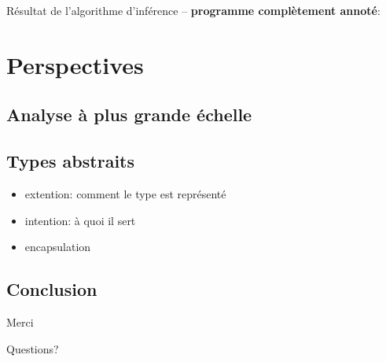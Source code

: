 \documentclass{beamer}
\def\codeout#1{
    \begin{center}
    \fboxsep=2mm
    \colorbox{codeoutcol}{\BUseVerbatim{#1}}
    \end{center}
}
\begin{document}
\begin{frame}[fragile]


Résultat de l'algorithme d'inférence -- \textbf{programme complètement annoté}:

\codeout{drmok}
\end{frame}

\section{Perspectives}

\subsection{Analyse à plus grande échelle}

\subsection{Types abstraits}

\begin{frame}
    \begin{itemize}
        \item extention: comment le type est représenté
        \item intention: à quoi il sert
    \end{itemize}
\end{frame}

\begin{frame}
\begin{itemize}
\item encapsulation
\end{itemize}
\end{frame}

\subsection{Conclusion}

\begin{frame}
    Merci

    Questions?
\end{frame}
\end{document}
